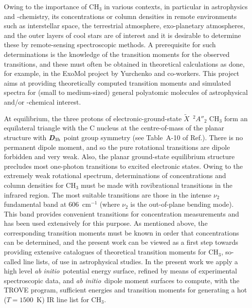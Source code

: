 \documentclass{achemso}
\newcommand{\3}{$_{3}$}
\newcommand{\ai}{\textit{ab initio}}
\begin{document}
Owing to the importance of CH$_3$ in various contexts, in particular in astrophysics and -chemistry,
its concentrations or column densities in remote environments such as interstellar space, the terrestrial
atmosphere, exo-planetary atmospheres, and the outer layers of cool stars are of interest and it is
desirable to determine these by remote-sensing spectroscopic methods. A prerequisite for such determinations
is the knowledge of the transition moments for the observed transitions, and these must often be obtained
in theoretical calculations as done, for example, in the ExoMol project\cite{jt528,exomol} by Yurchenko and
co-workers.\cite{jt564,nh3_09,jt571,jt592,jt580,jt641,jt597,jt612,jt701,jt620,jt638,jtlinTROVE,jt729}
This project aims at providing theoretically computed transition moments and simulated spectra for (small
to medium-sized) general polyatomic molecules of astrophysical and/or -chemical interest.

At equilibrium, the three protons of electronic-ground-state $\tilde{X}$~$^2A''_2$
CH$_3$ form an equilateral triangle with the C nucleus at the centre-of-mass of the planar structure
with {\itshape\bfseries D}$_{3{\rm h}}$ point group symmetry (see Table~A-10 of Ref.).
There is no permanent dipole moment, and so the pure rotational transitions are dipole forbidden and
very weak. Also, the planar ground-state equilibrium structure precludes most one-photon transitions
to excited electronic states.\cite{xelec83} Owing to the extremely weak rotational spectrum, determinations
of concentrations and column densities for CH$_3$ must be made with rovibrational transitions in the
infrared region. The most suitable transitions are those in the intense $\nu_2$ fundamental band at
606~cm$^{-1}$ (where $\nu_2$ is the out-of-plane bending mode). This band provides convenient transitions
for concentration measurements and  has been used extensively for this purpose\cite{mu2_83,mu2_89,mu2_05,mu2_08}.
As mentioned above, the corresponding transition moments must be known in order that concentrations
can be determined, and the present work can be viewed as a first step towards providing extensive
catalogues of theoretical transition moments for CH$_3$, so-called line lists, of use in astrophysical
studies. In the present work we apply a high level \ai\ potential energy surface, refined by means
of experimental spectroscopic data, and \ai\ dipole moment surfaces to compute, with the TROVE program,
\cite{trove05,trove07,trove15,trove17a} sufficient energies and transition moments for generating
a hot ($T=1500$~K) IR line list for CH$_3$.
\end{document}

